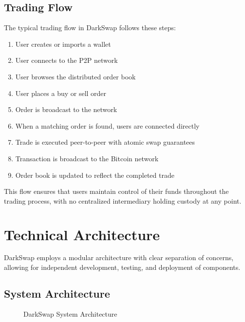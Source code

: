\documentclass[11pt,a4paper]{article}
\begin{document}
\subsection{Trading Flow}

The typical trading flow in DarkSwap follows these steps:

\begin{enumerate}
    \item User creates or imports a wallet
    \item User connects to the P2P network
    \item User browses the distributed order book
    \item User places a buy or sell order
    \item Order is broadcast to the network
    \item When a matching order is found, users are connected directly
    \item Trade is executed peer-to-peer with atomic swap guarantees
    \item Transaction is broadcast to the Bitcoin network
    \item Order book is updated to reflect the completed trade
\end{enumerate}

This flow ensures that users maintain control of their funds throughout the trading process, with no centralized intermediary holding custody at any point.

\section{Technical Architecture}

DarkSwap employs a modular architecture with clear separation of concerns, allowing for independent development, testing, and deployment of components.

\subsection{System Architecture}

\begin{figure}[H]
    \centering
    \caption{DarkSwap System Architecture}
\end{figure}
\end{document}
